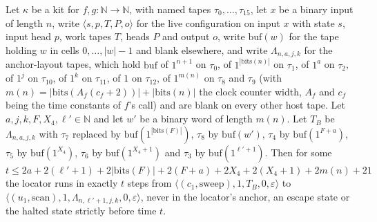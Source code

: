 \begin{theorem}
\label{Turing.NTimeDiag.qy_rnd_clean}
\leanok
{}
Let $\kappa$ be a kit for $f, g : \mathbb{N} \to \mathbb{N}$, with named tapes $\tau_0, \dots,
\tau_{15}$, let $x$ be a binary input of length $n$, write $\langle s, p, T, P, o\rangle$ for the
live configuration on input $x$ with state $s$, input head $p$, work tapes $T$, heads $P$ and
output $o$, write $\mathrm{buf}(w)$ for the tape holding $w$ in cells $0, \dots, |w| - 1$ and blank
elsewhere, and write $\Lambda_{n,a,j,k}$ for the anchor-layout tapes, which hold $\mathrm{buf}$ of
$1^{n+1}$ on $\tau_0$, of $1^{|\mathrm{bits}(n)|}$ on $\tau_1$, of $1^a$ on $\tau_2$, of $1^j$ on
$\tau_{10}$, of $1^k$ on $\tau_{11}$, of $1$ on $\tau_{12}$, of $1^{m(n)}$ on $\tau_8$ and $\tau_9$
(with $m(n) = |\mathrm{bits}(A_f(c_f + 2))| + |\mathrm{bits}(n)|$ the clock counter width, $A_f$
and $c_f$ being the time constants of $f$'s call) and are blank on every other host tape. Let $a,
j, k, F, X_4, \ell' \in \mathbb{N}$ and let $w'$ be a binary word of length $m(n)$. Let $T_B$ be
$\Lambda_{n,a,j,k}$ with $\tau_7$ replaced by $\mathrm{buf}(1^{|\mathrm{bits}(F)|})$, $\tau_8$ by
$\mathrm{buf}(w')$, $\tau_4$ by $\mathrm{buf}(1^{F + a})$, $\tau_5$ by $\mathrm{buf}(1^{X_4})$,
$\tau_6$ by $\mathrm{buf}(1^{X_4 + 1})$ and $\tau_3$ by $\mathrm{buf}(1^{\ell' + 1})$. Then for
some $t \le 2a + 2(\ell' + 1) + 2|\mathrm{bits}(F)| + 2(F + a) + 2X_4 + 2(X_4 + 1) + 2m(n) + 21$
the locator runs in exactly $t$ steps from $\langle (c_1, \mathrm{sweep}), 1, T_B, 0, \varepsilon
\rangle$ to $\langle (u_1, \mathrm{scan}), 1, \Lambda_{n,\ell' + 1,j,k}, 0, \varepsilon\rangle$,
never in the locator's anchor, an escape state or the halted state strictly before time $t$.
\end{theorem}

